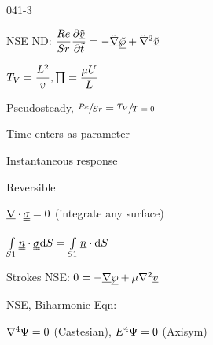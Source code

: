 \begin{mitframe}{041-3}

            
\begin{listone}

\item NSE ND: $\dfrac{\reynolds}{\strouhal}\dfrac{\partial\uline{\tilde{\vvel}}}{\partial\tilde{t}}=-\tilde{\gradop}\uline{\tilde{\dynpress}}+\tilde{\nabla}^2\uline{\tilde{\vvel}}$

\item $\Temp_{\vol}=\dfrac{\length^2}{\vvel}, \prod=\dfrac{\chempot\uvel}{\length}$

				\begin{listtwo}  
                \item Pseudosteady, $\sfrac{\reynolds}{\strouhal}=\sfrac{\Temp_{\vol}}{\Temp=0}$
                
                \item Time enters as parameter
                \item Instantaneous response
                \item Reversible
                 			\begin{listthree}
                            \item $\gradop\cdot\uuline{\molecrad}=0$ (integrate any surface)
                            
                            \item $\int\limits_{\entropy{1}}\uuline{n}\cdot\uuline{\molecrad}\mathrm{d}\entropy=\int\limits_{\entropy{1}}\uline{n}\cdot\mathrm{d}\entropy$
                            
                            \end{listthree}
                  
                      \end{listtwo}
\item Strokes NSE: $0=-\gradop\uline{\dynpress}+\chempot\nabla^2\uline{\vvel}$
\item NSE, Biharmonic Eqn:
					\begin{listtwo}
                    \item $\nabla^4\streamfunc=0$ (Castesian), $\energy^4\streamfunc=0$ (Axisym)
                    \end{listtwo}
\end{listone}

\end{mitframe}